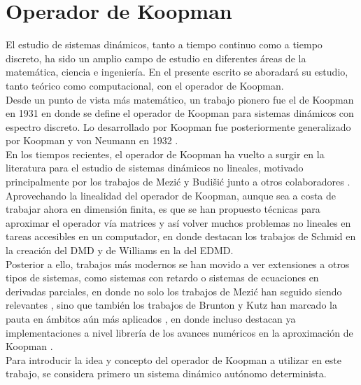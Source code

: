 \section{Operador de Koopman}
El estudio de sistemas dinámicos, tanto a tiempo continuo como a tiempo discreto, ha sido un amplio campo de estudio en diferentes áreas de la matemática, ciencia e ingeniería. En el presente escrito se aboradará su estudio, tanto teórico como computacional, con el operador de Koopman. \\ Desde un punto de vista más matemático, un trabajo pionero fue el de Koopman en 1931 \cite{Koopman1931HamiltonianSpace} en donde se define el operador de Koopman para sistemas dinámicos con espectro discreto. Lo desarrollado por Koopman fue posteriormente generalizado por Koopman y von Neumann en 1932 \cite{Koopman1932DynamicalSpectra}.\\
En los tiempos recientes, el operador de Koopman ha vuelto a surgir en la literatura para el estudio de sistemas dinámicos no lineales, motivado principalmente por los trabajos de Mezić y Budišić junto a otros colaboradores \cite{Budisic2009AnObservables, Budisic2012GeometryFlows, Budisic2012AppliedKoopmanism}. \\
Aprovechando la linealidad del operador de Koopman, aunque sea a costa de trabajar ahora en dimensión finita, es que se han propuesto técnicas para aproximar el operador vía matrices y así volver muchos problemas no lineales en tareas accesibles en un computador, en donde destacan los trabajos de Schmid \cite{Schmid2008DynamicData} en la creación del DMD y de Williams \cite{Williams2015ADecomposition} en la del EDMD.\\
Posterior a ello, trabajos más modernos se han movido a ver extensiones a otros tipos de sistemas, como sistemas con retardo o sistemas de ecuaciones en derivadas parciales, en donde no solo los trabajos de Mezić han seguido siendo relevantes \cite{Mezic2013AnalysisOperator, Mezic2020SpectrumGeometry, Mezic2022OnOperator}, sino que también los trabajos de Brunton y Kutz han marcado la pauta en ámbitos aún más aplicados \cite{Kaiser2021Data-drivenControl, Brunton2016KoopmanControl, Proctor2018GeneralizingControl, Lusch2018DeepDynamics, Kamb2020Time-delayApplications, NathanKutz2018AppliedSystems}, en donde incluso destacan ya implementaciones a nivel librería de los avances numéricos en la aproximación de Koopman \cite{Pan2024PyKoopman:Operator}.\\
Para introducir la idea y concepto del operador de Koopman a utilizar en este trabajo, se considera primero un sistema dinámico autónomo determinista.
